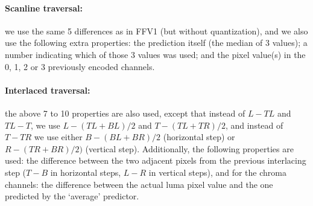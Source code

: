 \documentclass{article}
\begin{document}
\noindent
\paragraph{Scanline traversal:}
we use the same 5 differences as in %
FFV1 (but without quantization),
and we also use the following extra properties:
the prediction itself (the median of 3 values);
a number indicating which of those 3 values was used;
and the pixel value(s) in the 0, 1, 2 or 3 previously encoded channels.

\noindent
\paragraph{Interlaced traversal:}
the above 7 to 10 properties are also used,
except that instead of $L-TL$ and $TL-T$, we use
$L-(TL+BL)/2$ and $T-(TL+TR)/2$, and instead of $T-TR$ we
use either $B-(BL+BR)/2$ (horizontal step) or $R-(TR+BR)/2)$ (vertical step).
Additionally, the following properties are used: the
difference between the two adjacent pixels from the previous interlacing step
($T-B$ in horizontal steps, $L-R$ in vertical steps),
and for the chroma channels: the difference between the actual luma pixel value
and the one predicted by the `average' predictor.


\end{document}
